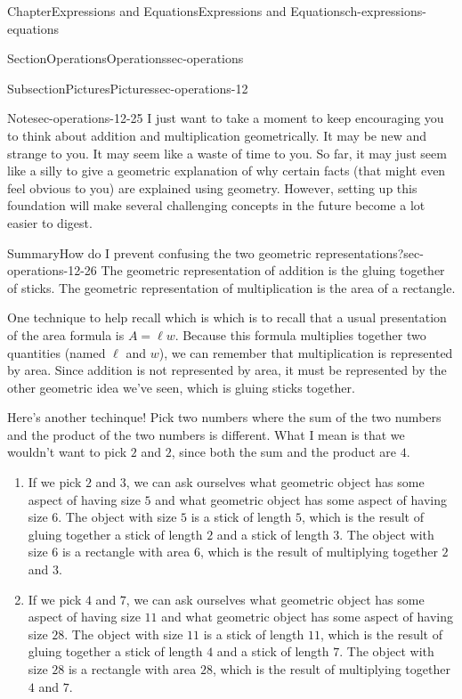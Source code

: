 \documentclass[twoside,11pt,]{book}
\numberwithin{equation}{chapter}
\begin{document}
\begin{chapterptx}{Chapter}{Expressions and Equations}{}{Expressions and Equations}{}{}{ch-expressions-equations}
\begin{sectionptx}{Section}{Operations}{}{Operations}{}{}{sec-operations}
\begin{subsectionptx}{Subsection}{Pictures}{}{Pictures}{}{}{sec-operations-12}
\begin{note}{Note}{}{sec-operations-12-25}%
I just want to take a moment to keep encouraging you to think about addition and multiplication geometrically. It may be new and strange to you. It may seem like a waste of time to you. So far, it may just seem like a silly to give a geometric explanation of why certain facts (that might even feel obvious to you) are explained using geometry. However, setting up this foundation will make several challenging concepts in the future become a lot easier to digest.%
\end{note}
\begin{assemblage}{Summary}{How do I prevent confusing the two geometric representations?}{sec-operations-12-26}%
The geometric representation of addition is the gluing together of sticks. The geometric representation of multiplication is the area of a rectangle.%
\par
One technique to help recall which is which is to recall that a usual presentation of the area formula is \(A = \ell w\). Because this formula multiplies together two quantities (named \(\ell\) and \(w\)), we can remember that multiplication is represented by area. Since addition is not represented by area, it must be represented by the other geometric idea we've seen, which is gluing sticks together.%
\par
Here's another techinque! Pick two numbers where the sum of the two numbers and the product of the two numbers is different. What I mean is that we wouldn't want to pick \(2\) and \(2\), since both the sum and the product are \(4\).%
\begin{enumerate}
\item{}If we pick \(2\) and \(3\), we can ask ourselves what geometric object has some aspect of having size \(5\) and what geometric object has some aspect of having size \(6\). The object with size \(5\) is a stick of length \(5\), which is the result of gluing together a stick of length \(2\) and a stick of length \(3\). The object with size \(6\) is a rectangle with area \(6\), which is the result of multiplying together \(2\) and \(3\).%
\item{}If we pick \(4\) and \(7\), we can ask ourselves what geometric object has some aspect of having size \(11\) and what geometric object has some aspect of having size \(28\). The object with size \(11\) is a stick of length \(11\), which is the result of gluing together a stick of length \(4\) and a stick of length \(7\). The object with size \(28\) is a rectangle with area \(28\), which is the result of multiplying together \(4\) and \(7\).%

\end{enumerate}
\end{assemblage}
\end{subsectionptx}
\end{sectionptx}
\end{chapterptx}
\end{document}
